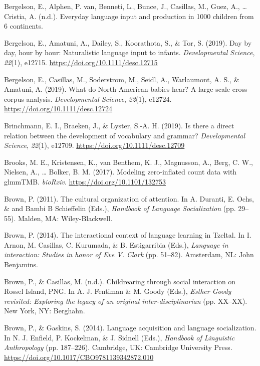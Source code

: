\documentclass[
  english,
  ,man,floatsintext]{apa6}
\begin{document}
\leavevmode\hypertarget{ref-bergelsonURbsl}{}%
Bergelson, E., Alphen, P. van, Benneti, L., Bunce, J., Casillas, M., Guez, A., \ldots{} Cristia, A. (n.d.). Everyday language input and production in 1000 children from 6 continents.

\leavevmode\hypertarget{ref-bergelson2019day}{}%
Bergelson, E., Amatuni, A., Dailey, S., Koorathota, S., \& Tor, S. (2019). Day by day, hour by hour: Naturalistic language input to infants. \emph{Developmental Science}, \emph{22}(1), e12715. \url{https://doi.org/10.1111/desc.12715}

\leavevmode\hypertarget{ref-bergelsoncasillas2019what}{}%
Bergelson, E., Casillas, M., Soderstrom, M., Seidl, A., Warlaumont, A. S., \& Amatuni, A. (2019). What do North American babies hear? A large-scale cross-corpus analysis. \emph{Developmental Science}, \emph{22}(1), e12724. \url{https://doi.org/10.1111/desc.12724}

\leavevmode\hypertarget{ref-brinchmann2019direct}{}%
Brinchmann, E. I., Braeken, J., \& Lyster, S.-A. H. (2019). Is there a direct relation between the development of vocabulary and grammar? \emph{Developmental Science}, \emph{22}(1), e12709. \url{https://doi.org/10.1111/desc.12709}

\leavevmode\hypertarget{ref-brooks2017modeling}{}%
Brooks, M. E., Kristensen, K., van Benthem, K. J., Magnusson, A., Berg, C. W., Nielsen, A., \ldots{} Bolker, B. M. (2017). Modeling zero-inflated count data with glmmTMB. \emph{bioRxiv}. \url{https://doi.org/10.1101/132753}

\leavevmode\hypertarget{ref-brown2011cultural}{}%
Brown, P. (2011). The cultural organization of attention. In A. Duranti, E. Ochs, \& and Bambi B Schieffelin (Eds.), \emph{Handbook of Language Socialization} (pp. 29--55). Malden, MA: Wiley-Blackwell.

\leavevmode\hypertarget{ref-brown2014interactional}{}%
Brown, P. (2014). The interactional context of language learning in Tzeltal. In I. Arnon, M. Casillas, C. Kurumada, \& B. Estigarribia (Eds.), \emph{Language in interaction: Studies in honor of Eve V. Clark} (pp. 51--82). Amsterdam, NL: John Benjamins.

\leavevmode\hypertarget{ref-brownIPchildrearing}{}%
Brown, P., \& Casillas, M. (n.d.). Childrearing through social interaction on Rossel Island, PNG. In A. J. Fentiman \& M. Goody (Eds.), \emph{Esther Goody revisited: Exploring the legacy of an original inter-disciplinarian} (pp. XX--XX). New York, NY: Berghahn.

\leavevmode\hypertarget{ref-brown2014language}{}%
Brown, P., \& Gaskins, S. (2014). Language acquisition and language socialization. In N. J. Enfield, P. Kockelman, \& J. Sidnell (Eds.), \emph{Handbook of Linguistic Anthropology} (pp. 187--226). Cambridge, UK: Cambridge University Press. \url{https://doi.org/10.1017/CBO9781139342872.010}
\end{document}
